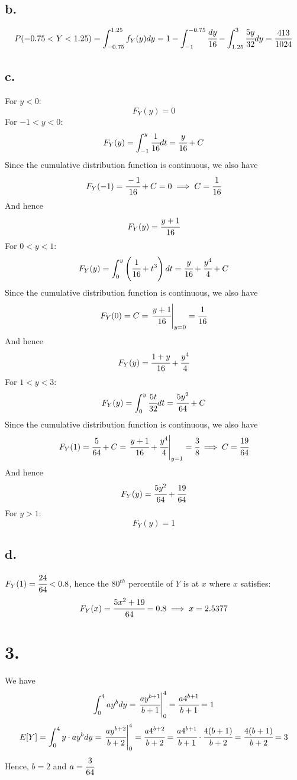 \documentclass[11pt]{article}
\begin{document}
\subsection*{b.}
\[
P(-0.75 < Y < 1.25) = \int_{-0.75}^{1.25} f_Y(y) dy = 1- \int_{-1}^{-0.75} \cfrac{dy}{16} - \int_{1.25}^3 \cfrac{5y}{32} dy = \frac{413}{1024}
\]
\subsection*{c.}
For $y < 0$:
\[F_Y(y) = 0\]
For $-1 < y < 0$:
\[F_Y(y) = \int_{-1}^y \cfrac{1}{16} dt = \cfrac{y}{16} + C\]
Since the cumulative distribution function is continuous, we also have 
\[
F_Y(-1) = \cfrac{-1}{16} + C = 0 \implies C = \cfrac{1}{16}   
\]
And hence
\[
    F_Y(y) = \cfrac{y+1}{16}  
\]
For $0 < y < 1$:
\[F_Y(y) = \int_{0}^y \left(\cfrac{1}{16} + t^3 \right) dt = \cfrac{y}{16} + \cfrac{y^4}{4}+ C\]
Since the cumulative distribution function is continuous, we also have 
\[
F_Y(0) = C =  \left. \cfrac{y+1}{16} \right|_{y=0} = \cfrac{1}{16}
\]
And hence
\[
    F_Y(y) = \cfrac{1+y}{16} + \cfrac{y^4}{4}
\]
For $1 < y < 3$:
\[F_Y(y) = \int_{0}^y \cfrac{5t}{32} dt = \cfrac{5y^2}{64} + C\]
Since the cumulative distribution function is continuous, we also have 
\[
F_Y(1) = \cfrac{5}{64} + C =  \left. \cfrac{y+1}{16} + \cfrac{y^4}{4} \right|_{y=1} = \cfrac{3}{8} \implies C = \cfrac{19}{64}
\]
And hence
\[
    F_Y(y) = \cfrac{5y^2}{64} + \cfrac{19}{64} 
\]
For $y>1$:
\[F_Y(y) = 1\]
\subsection*{d.}
$F_Y(1) = \cfrac{24}{64} < 0.8$, hence the $80^{th}$ percentile of $Y$ is at $x$ where $x$ satisfies:
\[
    F_Y(x) = \cfrac{5x^2+ 19}{64} = 0.8 \implies x = 2.5377 
\]  
\pagebreak






\section*{3.}
We have
\begin{equation*}
\int_0^4 ay^b dy = \left. \cfrac{ay^{b+1}}{b+1} \right|_0^4 = \cfrac{a4^{b+1}}{b+1} = 1
\end{equation*}
\begin{equation*}
E[Y] = \int_0^4 y \cdot ay^b dy = \left. \cfrac{ay^{b+2}}{b+2} \right|_0^4 = \cfrac{a4^{b+2}}{b+2} = \cfrac{a4^{b+1}}{b+1} \cdot \cfrac{4(b+1)}{b+2} = \cfrac{4(b+1)}{b+2} = 3
\end{equation*}
Hence, $b=2$ and $a = \cfrac{3}{64}$ 
\pagebreak
\end{document}
